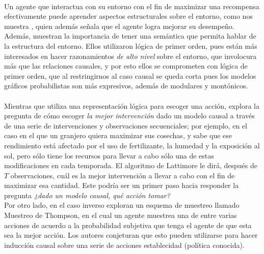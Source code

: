 \documentclass[11pt]{article}
\theoremstyle{plain}
\begin{document}
\\
Un agente que interactua con su entorno con el fin de maximizar una recompensa efectivamente puede aprender aspectos estructurales sobre el entorno, como nos muestra \cite{garnelo2016towards}, quien además señala que el agente logra mejorar su desempeño. Además, muestran la importancia de tener una semántica que permita hablar de la estructura del entorno. Ellos utilizaron lógica de primer orden, pues están más interesados en hacer razonamientos \textit{de alto nivel} sobre el entorno, que involocura más que las relaciones causales, y por esto ellos se comprometen con lógica de primer orden, que al restringirnos al caso causal se queda corta pues los modelos gráficos probabilistas son más expresivos, además de modulares y montónicos.\\
\\
Mientras que \cite{garnelo2016towards} utiliza una representación lógica para escoger una acción, \cite{lattimoreNIPS2016} explora la pregunta de cómo escoger \textit{la mejor intervención} dado un modelo causal a través de una serie de intervenciones y observaciones secuenciales; por ejemplo, en el caso en el que un granjero quiera maximizar sus cosechas, y sabe que ese rendimiento está afectado por el uso de fertilizante, la humedad y la exposición al sol, pero sólo tiene los recursos para llevar a cabo sólo una de estas modificaciones en cada temporada. El algoritmo de Lattimore le dirá, después de $T$ observaciones, cuál es la mejor intervención a llevar a cabo con el fin de maximizar esa cantidad. Este podría ser un primer paso hacia responder la pregunta \textit{¿dado un modelo causal, qué acción tomar?}
\\
Por otro lado, en el caso inverso \cite{ortega2014generalized} exploran un esquema de muestreo llamado Muestreo de Thompson, en el cual un agente muestrea una de entre varias acciones de acuerdo a la probabilidad subjetiva que tenga el agente de que esta sea la mejor acción. Los autores conjeturan que esto pueden utilizarse para hacer inducción causal sobre una serie de acciones establecidad (política conocida).\\
\\
\cite{ho2016reinforcement}\\
\\
\cite{ortega2015causal}
\end{document}
